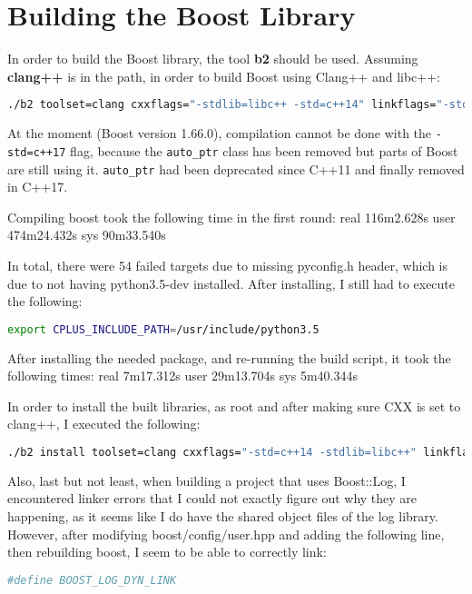 \chapter{Building the Boost Library}

In order to build the Boost library, the tool \textbf{b2} should be used. Assuming \textbf{clang++} is in the path, in order to build Boost using Clang++ and libc++:

\begin{lstlisting}[language=bash]
    ./b2 toolset=clang cxxflags="-stdlib=libc++ -std=c++14" linkflags="-stdlib=libc++" -j 8
\end{lstlisting}

At the moment (Boost version 1.66.0), compilation cannot be done with the \lstinline[language=bash]|-std=c++17| flag, because the \lstinline|auto_ptr| class has been removed but parts of Boost are still using it. \lstinline|auto_ptr| had been deprecated since C++11 and finally removed in C++17.

Compiling boost took the following time in the first round:
real	116m2.628s
user	474m24.432s
sys	90m33.540s

In total, there were 54 failed targets due to missing pyconfig.h header, which is due to not having python3.5-dev installed. After installing, I still had to execute the following:
\begin{lstlisting}[language=bash]
    export CPLUS_INCLUDE_PATH=/usr/include/python3.5
\end{lstlisting}

After installing the needed package, and re-running the build script, it took the following times:
real	7m17.312s
user	29m13.704s
sys	5m40.344s

In order to install the built libraries, as root and after making sure CXX is set to clang++, I executed the following:
\begin{lstlisting}[language=bash]
    ./b2 install toolset=clang cxxflags="-std=c++14 -stdlib=libc++" linkflags="-stdlib=libc++" --prefix=/usr/local
\end{lstlisting}

Also, last but not least, when building a project that uses Boost::Log, I encountered linker errors that I could not exactly figure out why they are happening, as it seems like I do have the shared object files of the log library. However, after modifying boost/config/user.hpp and adding the following line, then rebuilding boost, I seem to be able to correctly link:
\begin{lstlisting}[language=bash]
    #define BOOST_LOG_DYN_LINK
\end{lstlisting}

